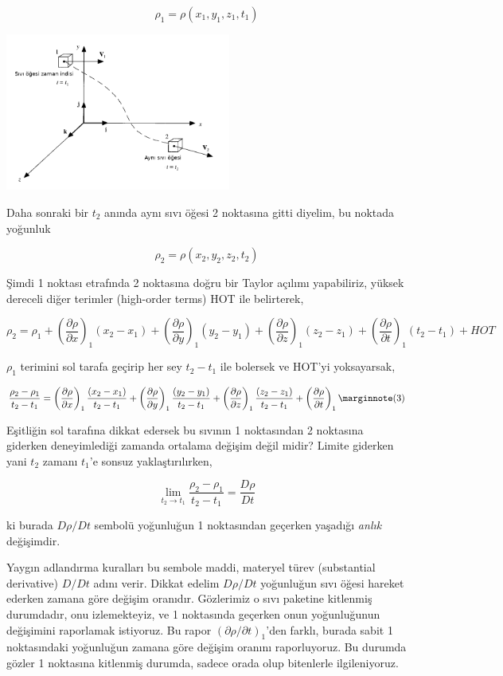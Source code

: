 \documentclass[12pt,fleqn]{article}\usepackage{../../common}
\begin{document}
$$
\rho_1 = \rho(x_1,y_1,z_1,t_1)
$$

\includegraphics[width=20em]{phy_050_cons_04.png}

Daha sonraki bir $t_2$ anında aynı sıvı öğesi 2 noktasına gitti diyelim, bu
noktada yoğunluk

$$
\rho_2 = \rho(x_2,y_2,z_2,t_2)
$$

Şimdi 1 noktası etrafında 2 noktasına doğru bir Taylor açılımı yapabiliriz,
yüksek dereceli diğer terimler (high-order terms) HOT ile belirterek,

$$
\rho_2 =
\rho_1 + \left( \frac{\partial \rho}{\partial x}  \right)_1 (x_2-x_1) +
\left( \frac{\partial \rho}{\partial y}  \right)_1 (y_2-y_1) +
\left( \frac{\partial \rho}{\partial z}  \right)_1 (z_2-z_1) +
\left( \frac{\partial \rho}{\partial t}  \right)_1 (t_2-t_1) +
HOT
$$

$\rho_1$ terimini sol tarafa geçirip her sey $t_2-t_1$ ile bolersek ve
HOT'yi yoksayarsak,

$$
\frac{\rho_2-\rho_1}{t_2-t_1} =
\left( \frac{\partial \rho}{\partial x}  \right)_1 \frac{(x_2-x_1)}{t_2-t_1} +
\left( \frac{\partial \rho}{\partial y}  \right)_1 \frac{(y_2-y_1)}{t_2-t_1} +
\left( \frac{\partial \rho}{\partial z}  \right)_1 \frac{(z_2-z_1)}{t_2-t_1} +
\left( \frac{\partial \rho}{\partial t}  \right)_1
\mlabel{3}
$$

Eşitliğin sol tarafına dikkat edersek bu sıvının 1 noktasından 2 noktasına
giderken deneyimlediği zamanda ortalama değişim değil midir? Limite giderken
yani $t_2$ zamanı $t_1$'e sonsuz yaklaştırılırken,

$$
\lim_{t_2 \to t_1} \frac{\rho_2-\rho_1}{t_2-t_1} = \frac{D\rho}{D t}
$$

ki burada $D\rho/D t$ sembolü yoğunluğun 1 noktasından geçerken yaşadığı
{\em anlık} değişimdir.

Yaygın adlandırma kuralları bu sembole maddi, materyel türev (substantial
derivative) $D/Dt$ adını verir. Dikkat edelim $D\rho/Dt$ yoğunluğun sıvı öğesi
hareket ederken zamana göre değişim oranıdır. Gözlerimiz o sıvı paketine
kitlenmiş durumdadır, onu izlemekteyiz, ve 1 noktasında geçerken onun
yoğunluğunun değişimini raporlamak istiyoruz. Bu rapor
$(\partial \rho / \partial t)_1$'den farklı, burada sabit 1 noktasındaki
yoğunluğun zamana göre değişim oranını raporluyoruz. Bu durumda gözler 1
noktasına kitlenmiş durumda, sadece orada olup bitenlerle ilgileniyoruz. 
\end{document}
